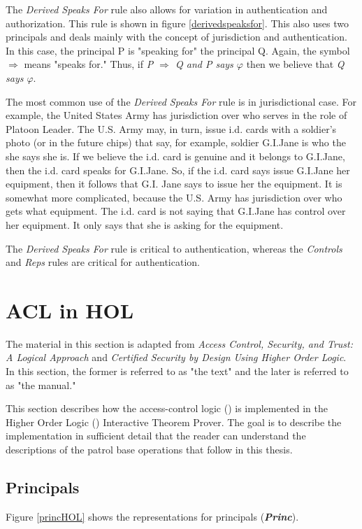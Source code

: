 \documentclass[../../main/main.tex]{subfiles}
\begin{document}
The \textit{Derived Speaks For} rule also allows for variation in authentication and authorization. This rule is shown in figure \ref{derivedspeaksfor}. This also uses two principals and deals mainly with the concept of jurisdiction and authentication.  In this case, the principal P is "speaking for" the principal Q.  Again, the symbol $\Rightarrow$ means "speaks for."  Thus, if \textit{P $\Rightarrow$ Q and P says $\varphi$} then we believe that \textit{Q says $\varphi$}.

The most common use of the \textit{Derived Speaks For}  rule is in jurisdictional case.  For example, the United States Army has jurisdiction over who serves in the role of Platoon Leader.  The U.S. Army may, in turn, issue i.d. cards with a soldier's photo (or in the future chips) that say, for example, soldier G.I.Jane is who the she says she is.  If we believe the i.d. card is genuine and it belongs to G.I.Jane, then the  i.d. card speaks for G.I.Jane.  So, if the i.d. card says issue G.I.Jane her equipment, then it follows that G.I. Jane says to issue her the equipment.  It is somewhat more complicated, because the U.S. Army has jurisdiction over who gets what equipment.  The i.d. card is not saying that G.I.Jane has control over her equipment.  It only says that she is asking for the equipment.  

The \textit{Derived Speaks For} rule is critical to authentication, whereas the \textit{Controls} and \textit{Reps} rules are critical for authentication.


\section{ACL in HOL} \label{sec:aclinhol}
The material in this section is adapted from \textit{Access Control, Security, and Trust: A Logical Approach}\cite{ChinOlder} and \textit{Certified Security by Design Using Higher Order Logic}\cite{certmanual}. In this section, the former is referred to as "the text" and the later is referred to as "the manual."


This section describes how the access-control logic () is implemented in the Higher Order Logic () Interactive Theorem Prover.
The goal is to describe the implementation in sufficient detail that the reader can understand the descriptions of the patrol base operations that follow in this thesis. 


\subsection{Principals}
Figure \ref{princHOL} shows the  representations for principals (\textbf{\textit{Princ}}).
\end{document}
